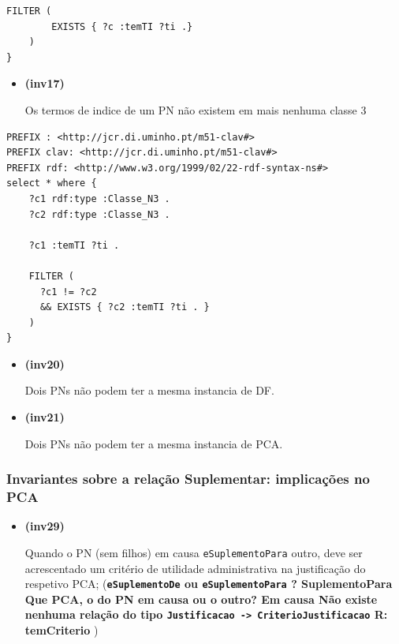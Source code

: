 \documentclass[tikz,runningheads,a4paper]{llncs}
\begin{document}
\begin{subappendices}
\begin{lstlisting}[language=sparql, frame=single, basicstyle=\scriptsize]
    FILTER (
        EXISTS { ?c :temTI ?ti .}
    )
}
\end{lstlisting}

\begin{itemize}
\tightlist
\item
  \hypertarget{inv17}{\textbf{(inv17)}} Os termos de indice de um PN não existem em mais
  nenhuma classe 3
\end{itemize}

\begin{lstlisting}[language=sparql, frame=single, basicstyle=\scriptsize]
PREFIX : <http://jcr.di.uminho.pt/m51-clav#>
PREFIX clav: <http://jcr.di.uminho.pt/m51-clav#>
PREFIX rdf: <http://www.w3.org/1999/02/22-rdf-syntax-ns#>
select * where { 
    ?c1 rdf:type :Classe_N3 .
    ?c2 rdf:type :Classe_N3 .

    ?c1 :temTI ?ti .

    FILTER (
      ?c1 != ?c2
      && EXISTS { ?c2 :temTI ?ti . }
    )
}
\end{lstlisting}

\begin{itemize}
\tightlist
\item
  \hypertarget{inv20}{\textbf{(inv20)}} Dois PNs não podem ter a mesma instancia de DF.
\item
  \hypertarget{inv21}{\textbf{(inv21)}} Dois PNs não podem ter a mesma instancia de PCA.
\end{itemize}

\hypertarget{invariantes-sobre-a-relacaoo-suplementar-implicacoes-no-pca}{%
\subsubsection{Invariantes sobre a relação Suplementar: implicações no
PCA}\label{invariantes-sobre-a-relauxe7uxe3o-suplementar-implicauxe7uxf5es-no-pca}}

\begin{itemize}
\tightlist
\item
  \hypertarget{inv29}{\textbf{(inv29)}} Quando o PN (sem filhos) em causa
  \texttt{eSuplementoPara} outro, deve ser acrescentado um critério de
  utilidade administrativa na justificação do respetivo PCA;
  (\textbf{\texttt{eSuplementoDe} ou \texttt{eSuplementoPara} ?
  SuplementoPara \textbar{} Que PCA, o do PN em causa ou o outro? Em
  causa \textbar{} Não existe nenhuma relação do tipo
  \texttt{Justificacao\ -\textgreater{}\ CriterioJustificacao} R:
  temCriterio })


\end{itemize}
\end{subappendices}
\end{document}
